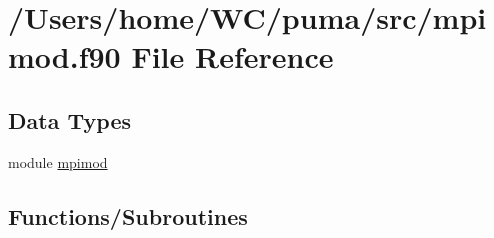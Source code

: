 \hypertarget{mpimod_8f90}{
\section{/\-Users/home/\-W\-C/puma/src/mpimod.f90 \-File \-Reference}
\label{mpimod_8f90}
}
\subsection*{\-Data \-Types}
\begin{DoxyCompactItemize}
\item 
module \hyperlink{classmpimod}{mpimod}
\end{DoxyCompactItemize}
\subsection*{\-Functions/\-Subroutines}
